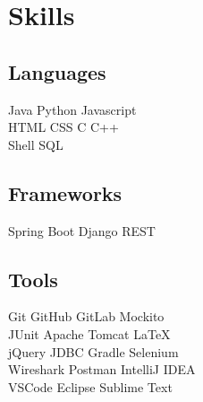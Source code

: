 \documentclass[]{deedy-resume-openfont}
\begin{document}
%
%
\lastupdated

%
%

%
%

\begin{minipage}[t]{0.33\textwidth} 


\section{Skills}
\subsection{Languages}
Java \textbullet{} Python \textbullet{} Javascript \\
 \textbullet{} HTML \textbullet{} CSS \textbullet{} C \textbullet{} C++ \\
\textbullet{} Shell \textbullet{} SQL \\

\subsection{Frameworks}
Spring Boot \textbullet{} Django REST\\

\subsection{Tools}
Git \textbullet{} GitHub  \textbullet{} GitLab  \textbullet{} Mockito \\ \textbullet{} JUnit \textbullet{} Apache Tomcat  \textbullet{} LaTeX \\ \textbullet{} jQuery \textbullet{} JDBC \textbullet{} Gradle \textbullet{} Selenium \\ \textbullet{} Wireshark \textbullet{} Postman\textbullet{} IntelliJ IDEA \\ \textbullet{} VSCode  \textbullet{} Eclipse \textbullet{} Sublime Text
\sectionsep


\end{minipage}
\end{document}

